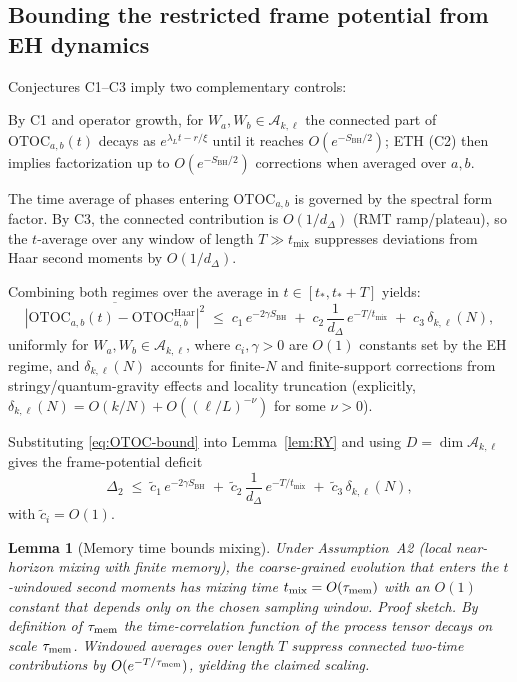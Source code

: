 \documentclass[a4paper,11pt]{article}
\theoremstyle{plain}
\newtheorem{lemma}{Lemma}
\theoremstyle{definition}
\theoremstyle{remark}
\begin{document}
\subsection*{Bounding the restricted frame potential from EH dynamics}
Conjectures C1--C3 imply two complementary controls:
\begin{description}[leftmargin=*,itemsep=0.3em]
  \item[(Early-to-intermediate times, $t_\ast\lesssim t\ll t_{\mathrm{Th}}$)] By C1 and operator growth, for $W_a,W_b\in \mathscr{A}_{k,\ell}$ the connected part of $\mathrm{OTOC}_{a,b}(t)$ decays as $e^{\lambda_L t - r/\xi}$ until it reaches $O(e^{-S_{\mathrm{BH}}/2})$; ETH (C2) then implies factorization up to $O(e^{-S_{\mathrm{BH}}/2})$ corrections when averaged over $a,b$.
  \item[(Late times, $t\gtrsim t_{\mathrm{Th}}$)] The time average of phases entering $\mathrm{OTOC}_{a,b}$ is governed by the spectral form factor.  By C3, the connected contribution is $O(1/d_\Delta)$ (RMT ramp/plateau), so the $t$-average over any window of length $T\gg t_{\mathrm{mix}}$ suppresses deviations from Haar second moments by $O(1/d_\Delta)$.
\end{description}
Combining both regimes over the average in $t\in[t_\ast,t_\ast+T]$ yields:
\begin{equation}\label{eq:OTOC-bound}
 \overline{\left| \mathrm{OTOC}_{a,b}(t) - \mathrm{OTOC}^{\mathrm{Haar}}_{a,b} \right|^2}
 \;\le\; c_1\, e^{-2\gamma S_{\mathrm{BH}}} \;+\; c_2\, \frac{1}{d_\Delta}\, e^{-T/t_{\mathrm{mix}}}
 \;+\; c_3\, \delta_{k,\ell}(N),
\end{equation}
uniformly for $W_a,W_b\in\mathscr{A}_{k,\ell}$, where $c_i,\gamma>0$ are $O(1)$ constants set by the EH regime, and $\delta_{k,\ell}(N)$ accounts for finite-$N$ and finite-support corrections from stringy/quantum-gravity effects and locality truncation (explicitly, $\delta_{k,\ell}(N)=O(k/N)+O((\ell/L)^{-\nu})$ for some $\nu>0$).

Substituting \eqref{eq:OTOC-bound} into Lemma~\ref{lem:RY} and using $D=\dim \mathscr{A}_{k,\ell}$ gives the frame-potential deficit
\begin{equation}\label{eq:Delta2-bound}
 \Delta_2 \;\le\; \tilde c_1\, e^{-2\gamma S_{\mathrm{BH}}}
 \;+\; \tilde c_2\, \frac{1}{d_\Delta}\, e^{-T/t_{\mathrm{mix}}}
 \;+\; \tilde c_3\, \delta_{k,\ell}(N),
\end{equation}
with $\tilde c_i=O(1)$.

\begin{lemma}[Memory time bounds mixing]
\label{lem:mem-to-mix}
Under Assumption~A2 (local near-horizon mixing with finite memory), the coarse-grained evolution that enters the $t$-windowed second moments
has mixing time $t_{\rm mix}=O(\tau_{\rm mem})$ with an $O(1)$ constant that depends only on the chosen sampling window.
\emph{Proof sketch.} By definition of $\tau_{\rm mem}$ the time-correlation function of the process tensor decays on scale $\tau_{\rm mem}$.
Windowed averages over length $T$ suppress connected two-time contributions by $O(e^{-T/\tau_{\rm mem}})$, yielding the claimed scaling.
\end{lemma}
\end{document}
